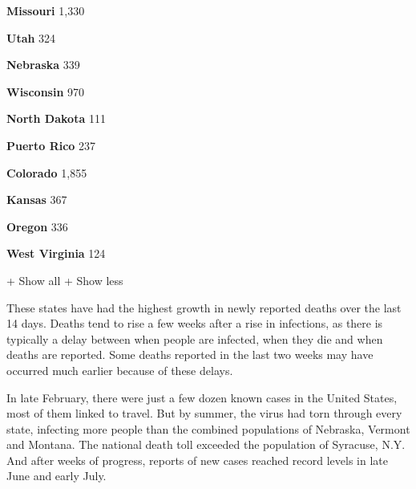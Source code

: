 \textbf{Missouri} 1,330

\href{https://www.nytimes.com/interactive/2020/us/utah-coronavirus-cases.html}{}

\textbf{Utah} 324

\href{https://www.nytimes.com/interactive/2020/us/nebraska-coronavirus-cases.html}{}

\textbf{Nebraska} 339

\href{https://www.nytimes.com/interactive/2020/us/wisconsin-coronavirus-cases.html}{}

\textbf{Wisconsin} 970

\href{https://www.nytimes.com/interactive/2020/us/north-dakota-coronavirus-cases.html}{}

\textbf{North Dakota} 111

\href{https://www.nytimes.com/interactive/2020/us/puerto-rico-coronavirus-cases.html}{}

\textbf{Puerto Rico} 237

\href{https://www.nytimes.com/interactive/2020/us/colorado-coronavirus-cases.html}{}

\textbf{Colorado} 1,855

\href{https://www.nytimes.com/interactive/2020/us/kansas-coronavirus-cases.html}{}

\textbf{Kansas} 367

\href{https://www.nytimes.com/interactive/2020/us/oregon-coronavirus-cases.html}{}

\textbf{Oregon} 336

\href{https://www.nytimes.com/interactive/2020/us/west-virginia-coronavirus-cases.html}{}

\textbf{West Virginia} 124

+ Show all + Show less

These states have had the highest growth in newly reported deaths over
the last 14 days. Deaths tend to rise a few weeks after a rise in
infections, as there is typically a delay between when people are
infected, when they die and when deaths are reported. Some deaths
reported in the last two weeks may have occurred much earlier because of
these delays.

In late February, there were just a few dozen known cases in the United
States, most of them linked to travel. But by summer, the virus had torn
through every state, infecting more people than the combined populations
of Nebraska, Vermont and Montana. The national death toll exceeded the
population of Syracuse, N.Y. And after weeks of progress, reports of new
cases reached record levels in late June and early July.

